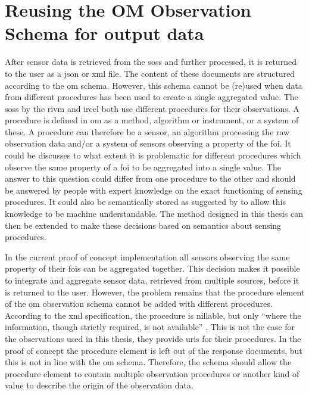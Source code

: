 \section{Reusing the OM Observation Schema for output data}
\label{reuseOM}
After sensor data is retrieved from the \aclp{sos} and further processed, it is returned to the user as a \ac{json} or \ac{xml} file. The content of these documents are structured according to the \ac{om} schema. However, this schema cannot be (re)used when data from different procedures has been used to create a single aggregated value. The \aclp{sos} by the \ac{rivm} and \ac{ircel} both use different procedures for their observations. A procedure is defined in \ac{om} as a method, algorithm or instrument, or a system of these. A procedure can therefore be a sensor, an algorithm processing the raw observation data and/or a system of sensors observing a property of the \ac{foi}. It could be discusses to what extent it is problematic for different procedures which observe the same property of a \ac{foi} to be aggregated into a single value. The answer to this question could differ from one procedure to the other and should be answered by people with expert knowledge on the exact functioning of sensing procedures. It could also be semantically stored as suggested by \cite{SSW:Stasch4} to allow this knowledge to be machine understandable. The method designed in this thesis can then be extended to make these decisions based on semantics about sensing procedures. 

In the current proof of concept implementation all sensors observing the same property of their \acp{foi} can be aggregated together. This decision makes it possible to integrate and aggregate sensor data, retrieved from multiple sources, before it is returned to the user. However, the problem remains that the procedure element of the \ac{om} observation schema cannot be added with different procedures. According to the \ac{xml} specification, the procedure is nillable, but only \enquote{where the information, though strictly required, is not available} \citep[p. 42]{SW:OGC8}. This is not the case for the observations used in this thesis, they provide \acp{uri} for their procedures. In the proof of concept the procedure element is left out of the response documents, but this is not in line with the \ac{om} schema. Therefore, the schema should allow the procedure element to contain multiple observation procedures or another kind of value to describe the origin of the observation data. 

